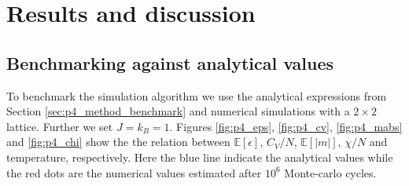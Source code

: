 \documentclass[../main_proj4_correct_template.tex]{subfiles}
\begin{document}
\section{Results and discussion}\label{sec:p4_results_and_discussion}

\subsection{Benchmarking against analytical values}

To benchmark the simulation algorithm we use the analytical expressions from Section \ref{sec:p4_method_benchmark} and numerical simulations with a $2\times 2$ lattice. Further we set $J=k_B=1$. Figures \ref{fig:p4_eps}, \ref{fig:p4_cv}, \ref{fig:p4_mabs} and \ref{fig:p4_chi} show the the relation between $\mathbb{E}[\epsilon]$, $C_V/N$, $\mathbb{E}[|m|]$, $\chi/N$ and temperature, respectively. Here the blue line indicate the analytical values while the red dots are the numerical values estimated after $10^{6}$ Monte-carlo cycles.
\end{document}
